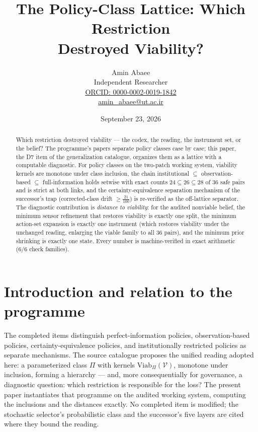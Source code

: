 \documentclass[10pt,twocolumn]{article}
\theoremstyle{definition}
\begin{document}
\title{The Policy-Class Lattice: Which Restriction\\ Destroyed Viability?}
\author{Amin Abaee\\[0.35em]
{\small Independent Researcher}\\[0.55em]
{\small\href{https://orcid.org/0000-0002-0019-1842}{ORCID: 0000-0002-0019-1842}}\\[0.3em]
{\small\href{mailto:amin\_abaee@ut.ac.ir}{amin\_abaee@ut.ac.ir}}}
\date{September 23, 2026}
\maketitle

\begin{abstract}
Which restriction destroyed viability --- the codex, the reading, the
instrument set, or the belief? The programme's papers separate policy
classes case by case; this paper, the D7 item of the generalization
catalogue, organizes them as a lattice with a computable diagnostic. For
policy classes on the two-patch working system, viability kernels are
monotone under class inclusion, the chain institutional $\subseteq$
observation-based $\subseteq$ full-information holds setwise with exact
counts $24\subseteq 26\subseteq 28$ of $36$ safe pairs and is strict at
both links, and the certainty-equivalence separation mechanism of the
successor's trap (corrected-class drift $\ge\tfrac{21}{100}$) is
re-verified as the off-lattice separator. The diagnostic contribution is
\emph{distance to viability}: for the audited nonviable belief, the
minimum sensor refinement that restores viability is exactly one split,
the minimum action-set expansion is exactly one instrument (which restores
viability under the unchanged reading, enlarging the viable family to all
$36$ pairs), and the minimum prior shrinking is exactly one state. Every
number is machine-verified in exact arithmetic (6/6 check families).
\end{abstract}

\section{Introduction and relation to the programme}

The completed items distinguish perfect-information policies,
observation-based policies, certainty-equivalence policies, and
institutionally restricted policies as separate mechanisms. The source
catalogue proposes the unified reading adopted here: a parameterized class
$\Pi$ with kernels $\mathrm{Viab}_\Pi(\mathcal V)$, monotone under
inclusion, forming a hierarchy --- and, more consequentially for
governance, a diagnostic question: which restriction is responsible for the
loss? The present paper instantiates that programme on the audited working
system, computing the inclusions and the distances exactly. No completed
item is modified; the stochastic selector's probabilistic class and the
successor's five layers are cited where they bound the reading.
\end{document}
